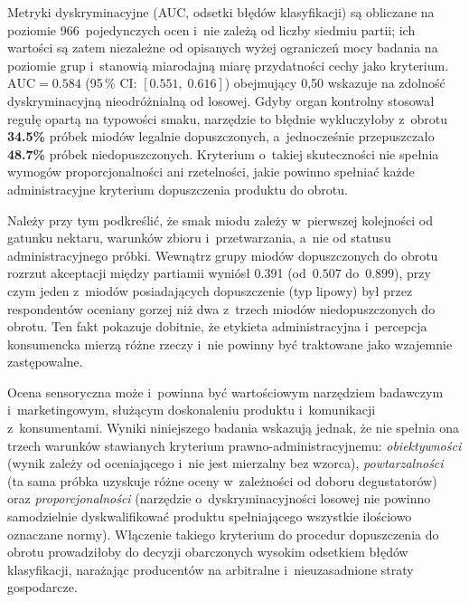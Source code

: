 Metryki dyskryminacyjne (AUC, odsetki błędów klasyfikacji) są obliczane na
poziomie 966~pojedynczych ocen i~nie zależą od liczby siedmiu partii;
ich wartości są zatem niezależne od opisanych wyżej ograniczeń mocy badania
na poziomie grup i~stanowią miarodajną miarę przydatności cechy jako kryterium.
$\mathrm{AUC} = 0.584$ (95\,\% CI: $[0.551,\;0.616]$)
obejmujący 0{,}50 wskazuje na zdolność dyskryminacyjną nieodróżnialną od losowej.
Gdyby organ kontrolny stosował regułę opartą na typowości smaku,
narzędzie to błędnie wykluczyłoby z~obrotu \textbf{34.5\%} próbek miodów
legalnie dopuszczonych, a~jednocześnie przepuszczało
\textbf{48.7\%} próbek niedopuszczonych.
Kryterium o~takiej skuteczności nie spełnia wymogów proporcjonalności
ani rzetelności, jakie powinno spełniać każde administracyjne kryterium
dopuszczenia produktu do obrotu.

Należy przy tym podkreślić, że smak miodu zależy w~pierwszej kolejności od
gatunku nektaru, warunków zbioru i~przetwarzania, a~nie od statusu
administracyjnego próbki.
Wewnątrz grupy miodów dopuszczonych do obrotu rozrzut akceptacji między partiamii
wyniósł 0.391 (od~$0.507$ do~$0.899$),
przy czym jeden z~miodów posiadających dopuszczenie (typ lipowy) był przez
respondentów oceniany gorzej niż dwa z~trzech miodów niedopuszczonych do obrotu.
Ten fakt pokazuje dobitnie, że etykieta administracyjna i~percepcja konsumencka
mierzą różne rzeczy i~nie powinny być traktowane jako wzajemnie zastępowalne.

Ocena sensoryczna może i~powinna być wartościowym narzędziem badawczym
i~marketingowym, służącym doskonaleniu produktu i~komunikacji z~konsumentami.
Wyniki niniejszego badania wskazują jednak, że nie spełnia ona trzech warunków
stawianych kryterium prawno-administracyjnemu: \emph{obiektywności} (wynik zależy
od oceniającego i~nie jest mierzalny bez wzorca), \emph{powtarzalności} (ta sama
próbka uzyskuje różne oceny w~zależności od doboru degustatorów) oraz
\emph{proporcjonalności} (narzędzie o~dyskryminacyjności losowej nie powinno
samodzielnie dyskwalifikować produktu spełniającego wszystkie ilościowo oznaczane
normy). Włączenie takiego kryterium do procedur dopuszczenia do obrotu prowadziłoby
do decyzji obarczonych wysokim odsetkiem błędów klasyfikacji, narażając
producentów na arbitralne i~nieuzasadnione straty gospodarcze.
